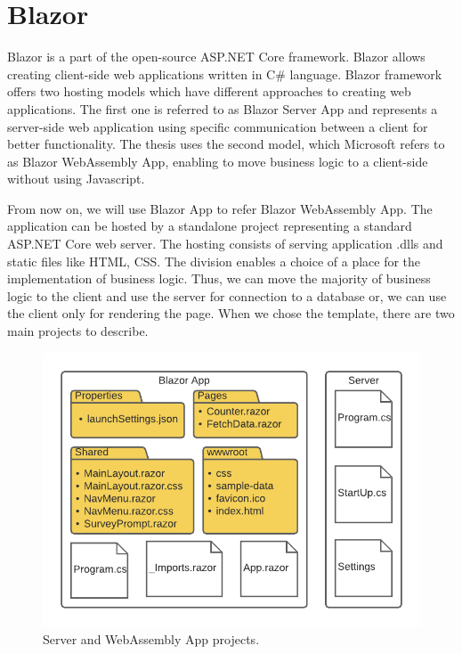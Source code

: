 \section{Blazor}

Blazor is a part of the open-source ASP.NET Core framework.
Blazor allows creating client-side web applications written in C\# language.
Blazor framework offers two hosting models \cite{online:hostingModels} which have different approaches to creating web applications. 
The first one is referred to as Blazor Server App and represents a server-side web application using specific communication between a client for better functionality.
The thesis uses the second model, which Microsoft refers to as Blazor WebAssembly App, enabling to move business logic to a client-side without using Javascript.
\par
From now on, we will use Blazor App to refer Blazor WebAssembly App.
The application can be hosted by a standalone project representing a standard ASP.NET Core web server.
The hosting consists of serving application .dlls and static files like HTML, CSS.
The division enables a choice of a place for the implementation of business logic.
Thus, we can move the majority of business logic to the client and use the server for connection to a database or, we can use the client only for rendering the page.
When we chose the template, there are two main projects to describe.
\par
\begin{figure}\centering
\includegraphics{./img/ProjectStructure}
\caption{Server and WebAssembly App projects.}
\label{img04:projects}
\end{figure} 
